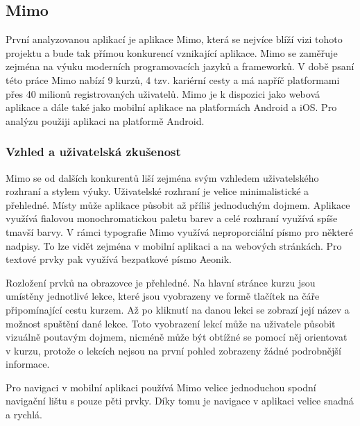 \subsection{Mimo}

První analyzovanou aplikací je aplikace Mimo, která se nejvíce blíží vizi tohoto projektu a bude tak přímou konkurencí vznikající aplikace. Mimo se zaměřuje zejména na výuku moderních programovacích jazyků a frameworků. V době psaní této práce Mimo nabízí 9 kurzů, 4 tzv. kariérní cesty a má napříč platformami přes 40 milionů registrovaných uživatelů. Mimo je k dispozici jako webová aplikace a dále také jako mobilní aplikace na platformách Android a iOS. Pro analýzu použiji aplikaci na platformě Android.

\subsubsection{Vzhled a uživatelská zkušenost}

Mimo se od dalších konkurentů liší zejména svým vzhledem uživatelského rozhraní a stylem výuky. Uživatelské rozhraní je velice minimalistické a přehledné. Místy může aplikace působit až příliš jednoduchým dojmem. Aplikace využívá fialovou monochromatickou paletu barev a celé rozhraní využívá spíše tmavší barvy. V rámci typografie Mimo využívá neproporciální písmo %
pro některé nadpisy. To lze vidět zejména v mobilní aplikaci a na webových stránkách. Pro textové prvky pak využívá bezpatkové písmo Aeonik.

Rozložení prvků na obrazovce je přehledné. Na hlavní stránce kurzu jsou umístěny jednotlivé lekce, které jsou vyobrazeny ve formě tlačítek na čáře připomínající cestu kurzem. Až po kliknutí na danou lekci se zobrazí její název a možnost spuštění dané lekce. Toto vyobrazení lekcí může na uživatele působit vizuálně poutavým dojmem, nicméně může být obtížné se pomocí něj orientovat v kurzu, protože o lekcích nejsou na první pohled zobrazeny žádné podrobnější informace.

Pro navigaci v mobilní aplikaci používá Mimo velice jednoduchou spodní navigační lištu %
s pouze pěti prvky. Díky tomu je navigace v aplikaci velice snadná a rychlá.

